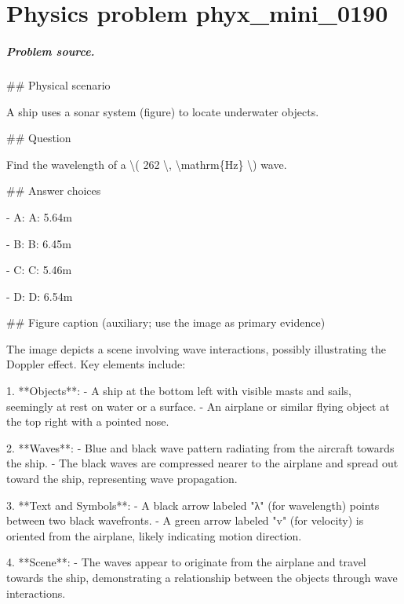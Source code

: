 
\chapter{Physics problem phyx\_mini\_0190}
\label{ch:PhyXMiniProblems_problem_phyx_mini_0190}

\paragraph{Problem source.}
\#\# Physical scenario

A ship uses a sonar system (figure) to locate underwater objects.

\#\# Question

Find the wavelength of a \textbackslash{}( 262 \textbackslash{}, \textbackslash{}mathrm\{Hz\} \textbackslash{}) wave.

\#\# Answer choices

- A: A: 5.64m

- B: B: 6.45m

- C: C: 5.46m

- D: D: 6.54m

\#\# Figure caption (auxiliary; use the image as primary evidence)

The image depicts a scene involving wave interactions, possibly illustrating the Doppler effect. Key elements include:

1. **Objects**:
   - A ship at the bottom left with visible masts and sails, seemingly at rest on water or a surface.
   - An airplane or similar flying object at the top right with a pointed nose.

2. **Waves**:
   - Blue and black wave pattern radiating from the aircraft towards the ship.
   - The black waves are compressed nearer to the airplane and spread out toward the ship, representing wave propagation.

3. **Text and Symbols**:
   - A black arrow labeled "λ" (for wavelength) points between two black wavefronts.
   - A green arrow labeled "v" (for velocity) is oriented from the airplane, likely indicating motion direction. 

4. **Scene**:
   - The waves appear to originate from the airplane and travel towards the ship, demonstrating a relationship between the objects through wave interactions.

